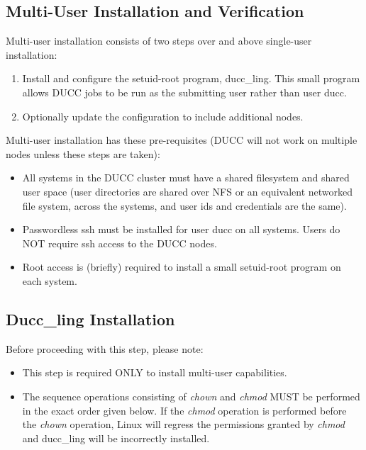 \subsection{Multi-User Installation and Verification}
  
    Multi-user installation consists of two steps over and above single-user installation:
    \begin{enumerate}
        \item Install and configure the setuid-root program, ducc\_ling.  This small program allows DUCC
          jobs to be run as the submitting user rather than user ducc.

        \item Optionally update the configuration to include additional nodes.
     \end{enumerate}

     Multi-user installation has these pre-requisites (DUCC will not work on multiple nodes
     unless these steps are taken):
     \begin{itemize}

         \item All systems in the DUCC cluster must have a shared filesystem and shared user space (user
           directories are shared over NFS or an equivalent networked file system, across the systems, and
           user ids and credentials are the same).

         \item Passwordless ssh must be installed for user ducc on all systems. Users do NOT require
           ssh access to the DUCC nodes.
           
         \item Root access is (briefly) required to install a small setuid-root program on each system.
      \end{itemize}

\subsection{Ducc\_ling Installation}
    Before proceeding with this step, please note: 
    \begin{itemize}
        \item This step is required ONLY to install multi-user capabilities.
        \item The sequence operations consisting of {\em chown} and {\em chmod} MUST be performed
          in the exact order given below.  If the {\em chmod} operation is performed before
          the {\em chown} operation, Linux will regress the permissions granted by {\em chmod} 
          and ducc\_ling will be incorrectly installed.
    \end{itemize}

